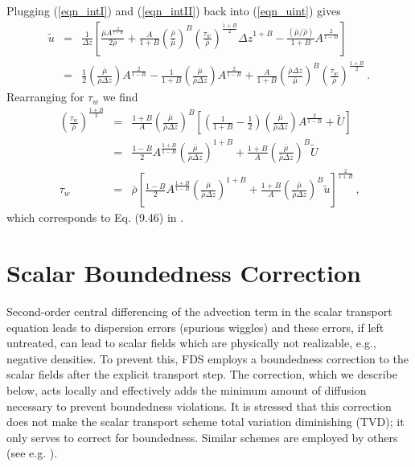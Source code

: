 Plugging (\ref{eqn_intI}) and (\ref{eqn_intII}) back into (\ref{eqn_uint}) gives
\begin{eqnarray}
\label{eqn_combineint}
\tilde{u} &=& \frac{1}{\Delta z} \left[ \frac{\bar{\mu} A^{\frac{2}{1-B}}}{2\bar{\rho}} + \frac{A}{1+B} \left(\frac{\bar{\rho}}{\bar{\mu}}\right)^B \left(\frac{\tau_w}{\bar{\rho}}\right)^{\frac{1+B}{2}} {\Delta z}^{1+B} - \frac{(\bar{\mu}/\bar{\rho})}{1+B} A^{\frac{2}{1-B}} \right] \nonumber\\
&=& \frac{1}{2} \left(\frac{\bar{\mu}}{\bar{\rho}\Delta z}\right) A^{\frac{2}{1-B}} - \frac{1}{1+B} \left(\frac{\bar{\mu}}{\bar{\rho}\Delta z}\right) A^{\frac{2}{1-B}} + \frac{A}{1+B} \left(\frac{\bar{\rho}\Delta z}{\bar{\mu}}\right)^B \left(\frac{\tau_w}{\bar{\rho}}\right)^{\frac{1+B}{2}} \,\mbox{.}
\end{eqnarray}
Rearranging for $\tau_w$ we find
\begin{eqnarray}
\label{eqn_rearrangefortauw}
\left(\frac{\tau_w}{\bar{\rho}}\right)^{\frac{1+B}{2}} &=& \frac{1+B}{A}\left(\frac{\bar{\mu}}{\bar{\rho}\Delta z}\right)^B \left[ \left( \frac{1}{1+B} - \frac{1}{2}\right)\left(\frac{\bar{\mu}}{\bar{\rho}\Delta z}\right)A^{\frac{2}{1-B}} + \tilde{U} \right] \nonumber\\
&=& \frac{1-B}{2} A^{\frac{1+B}{1-B}} \left(\frac{\bar{\mu}}{\bar{\rho}\Delta z}\right)^{1+B}  + \frac{1+B}{A} \left(\frac{\bar{\mu}}{\bar{\rho}\Delta z }\right)^B \tilde{U} \nonumber\\
\tau_w &=& \bar{\rho} \left[ \frac{1-B}{2} A^{\frac{1+B}{1-B}} \left(\frac{\bar{\mu}}{\bar{\rho}\Delta z}\right)^{1+B}  + \frac{1+B}{A} \left(\frac{\bar{\mu}}{\bar{\rho}\Delta z }\right)^B \tilde{u} \right]^{\frac{2}{1+B}} \,\mbox{,}
\end{eqnarray}
which corresponds to Eq. (9.46) in \cite{Sagaut:2001}.



\chapter{Scalar Boundedness Correction}
\label{app_boundedness}

Second-order central differencing of the advection term in the scalar transport equation leads to dispersion errors (spurious wiggles) and these errors, if left untreated, can lead to scalar fields which are physically not realizable, e.g., negative densities.  To prevent this, FDS employs a boundedness correction to the scalar fields after the explicit transport step.  The correction, which we describe below, acts locally and effectively adds the minimum amount of diffusion necessary to prevent boundedness violations.  It is stressed that this correction does not make the scalar transport scheme total variation diminishing (TVD); it only serves to correct for boundedness. Similar schemes are employed by others (see e.g. \cite{Herrmann:2005}).

